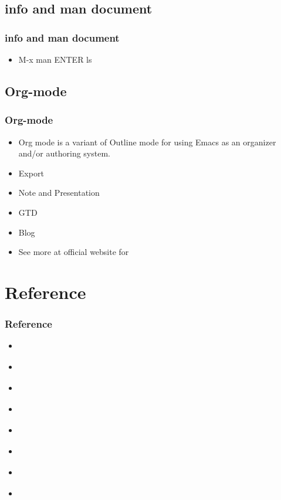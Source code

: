 \subsection{info and man document}
\begin{frame}
\frametitle{info and man document}
    \begin{itemize}
        \item M-x man ENTER ls
    \end{itemize}
\end{frame}
\subsection{Org-mode}
\begin{frame}
\frametitle{Org-mode}
    \begin{itemize}
        \item Org mode is a variant of Outline mode for using Emacs as an organizer and/or authoring system.
        \item Export
        \item Note and Presentation
        \item GTD
        \item Blog
        \item See more at official website for \href{http://orgmode.org/}{}
    \end{itemize}
\end{frame}
\section{Reference}
\begin{frame}
\frametitle{Reference}
    \begin{itemize}
        \item \href{http://pedrokroger.net/configuring-emacs-python-ide/}{}
        \item \href{http://orgmode.org/worg/exporters/beamer/tutorial.html}{}
        \item \href{http://orgmode.org/worg/org-tutorials/non-beamer-presentations.html}{}
        \item \href{http://www.gnu.org/software/emacs/}{}
        \item \href{https://github.com/alex8866/emacs}{}
        \item \href{http://doc.norang.ca/org-mode.html}{}
        \item \href{http://www.cnblogs.com/holbrook/archive/2012/04/17/2454619.html}{}
        \item \href{http://orgmode.org/worg/org-gtd-etc.html}{}
    \end{itemize}
\end{frame}


